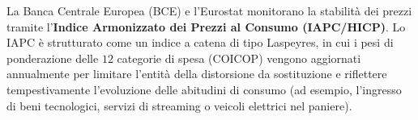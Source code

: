 \begin{empirico}
La Banca Centrale Europea (BCE) e l'Eurostat monitorano la stabilità dei prezzi tramite l'\textbf{Indice Armonizzato dei Prezzi al Consumo (IAPC/HICP)}. Lo IAPC è strutturato come un indice a catena di tipo Laspeyres, in cui i pesi di ponderazione delle $12$ categorie di spesa (COICOP) vengono aggiornati annualmente per limitare l'entità della distorsione da sostituzione e riflettere tempestivamente l'evoluzione delle abitudini di consumo (ad esempio, l'ingresso di beni tecnologici, servizi di streaming o veicoli elettrici nel paniere).
\end{empirico}
